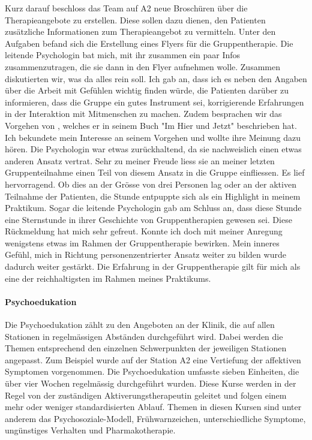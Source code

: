 Kurz darauf beschloss das Team auf A2 neue Broschüren über die Therapieangebote zu erstellen. Diese sollen dazu dienen, den Patienten zusätzliche Informationen zum Therapieangebot zu vermitteln. Unter den Aufgaben befand sich die Erstellung eines Flyers für die Gruppentherapie. Die leitende Psychologin bat mich, mit ihr zusammen ein paar Infos zusammenzutragen, die sie dann in den Flyer aufnehmen wolle. Zusammen diskutierten wir, was da alles rein soll. Ich gab an, dass ich es neben den Angaben über die Arbeit mit Gefühlen wichtig finden würde, die Patienten darüber zu informieren, dass die Gruppe ein gutes Instrument sei, korrigierende Erfahrungen in der Interaktion mit Mitmenschen zu machen. Zudem besprachen wir das Vorgehen von , welches er in seinem Buch "Im Hier und Jetzt" beschrieben hat. Ich bekundete mein Interesse an seinem Vorgehen und wollte ihre Meinung dazu hören. Die Psychologin war etwas zurückhaltend, da sie nachweislich einen etwas anderen Ansatz vertrat. Sehr zu meiner Freude liess sie an meiner letzten Gruppenteilnahme einen Teil von diesem Ansatz in die Gruppe einfliessen. Es lief hervorragend. Ob dies an der Grösse von drei Personen lag oder an der aktiven Teilnahme der Patienten, die Stunde entpuppte sich als ein Highlight in meinem Praktikum. Sogar die leitende Psychologin gab am Schluss an, dass diese Stunde eine Sternstunde in ihrer Geschichte von Gruppentherapien gewesen sei. Diese Rückmeldung hat mich sehr gefreut. Konnte ich doch mit meiner Anregung wenigstens etwas im Rahmen der Gruppentherapie bewirken. Mein inneres Gefühl, mich in Richtung personenzentrierter Ansatz weiter zu bilden wurde dadurch weiter gestärkt. Die Erfahrung in der Gruppentherapie gilt für mich als eine der reichhaltigsten im Rahmen meines Praktikums.

\paragraph{Psychoedukation}
Die Psychoedukation zählt zu den Angeboten an der Klinik, die auf allen Stationen in regelmässigen Abständen durchgeführt wird. Dabei werden die Themen entsprechend den einzelnen Schwerpunkten der jeweiligen Stationen angepasst. Zum Beispiel wurde auf der Station A2 eine Vertiefung der affektiven Symptomen vorgenommen. Die Psychoedukation umfasste sieben Einheiten, die über vier Wochen regelmässig durchgeführt wurden. Diese Kurse werden in der Regel von der zuständigen Aktiverungstherapeutin geleitet und folgen einem mehr oder weniger standardisierten Ablauf. Themen in diesen Kursen sind unter anderem das Psychosoziale-Modell, Frühwarnzeichen, unterschiedliche Symptome, ungünstiges Verhalten und Pharmakotherapie.

